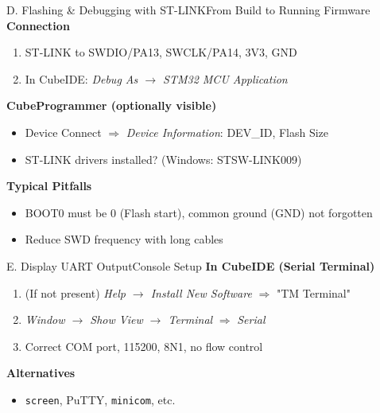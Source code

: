 \documentclass{beamer}
\begin{document}
\begin{frame}{D. Flashing \& Debugging with ST-LINK}{From Build to Running Firmware}
	\textbf{Connection}
	\begin{enumerate}
		\item ST-LINK to SWDIO/PA13, SWCLK/PA14, 3V3, GND
		\item In CubeIDE: \textit{Debug As $\rightarrow$ STM32 MCU Application}
	\end{enumerate}
	
	\medskip
	\textbf{CubeProgrammer (optionally visible)}
	\begin{itemize}
		\item Device Connect $\Rightarrow$ \textit{Device Information}: DEV\_ID, Flash Size
		\item ST-LINK drivers installed? (Windows: STSW-LINK009)
	\end{itemize}
	
	\medskip
	\textbf{Typical Pitfalls}
	\begin{itemize}
		\item BOOT0 must be 0 (Flash start), common ground (GND) not forgotten
		\item Reduce SWD frequency with long cables
	\end{itemize}
\end{frame}

\begin{frame}{E. Display UART Output}{Console Setup}
	\textbf{In CubeIDE (Serial Terminal)}
	\begin{enumerate}
		\item (If not present) \textit{Help $\rightarrow$ Install New Software} $\Rightarrow$ "TM Terminal"
		\item \textit{Window $\rightarrow$ Show View $\rightarrow$ Terminal} $\Rightarrow$ \textit{Serial}
		\item Correct COM port, 115200, 8N1, no flow control
	\end{enumerate}
	
	\medskip
	\textbf{Alternatives}
	\begin{itemize}
		\item \texttt{screen}, PuTTY, \texttt{minicom}, etc.
	\end{itemize}
\end{frame}
\end{document}
